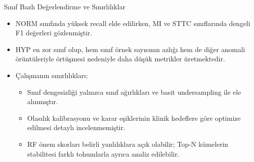 \documentclass[aspectratio=169]{beamer}
\begin{document}
\begin{frame}{Sınıf Bazlı Değerlendirme ve Sınırlılıklar}
	\begin{itemize}
		\item NORM sınıfında yüksek recall elde edilirken, MI ve STTC sınıflarında dengeli F1 değerleri gözlenmiştir.
		\item HYP en zor sınıf olup, hem sınıf örnek sayısının azlığı hem de diğer anomali örüntüleriyle örtüşmesi nedeniyle daha düşük metrikler üretmektedir.
		\item Çalışmanın sınırlılıkları:
		\begin{itemize}
			\item Sınıf dengesizliği yalnızca sınıf ağırlıkları ve basit undersampling ile ele alınmıştır.
			\item Olasılık kalibrasyonu ve karar eşiklerinin klinik hedeflere göre optimize edilmesi detaylı incelenmemiştir.
			\item RF önem skorları belirli yanlılıklara açık olabilir; Top-N kümelerin stabilitesi farklı tohumlarla ayrıca analiz edilebilir.
		\end{itemize}
	\end{itemize}
\end{frame}
\end{document}

